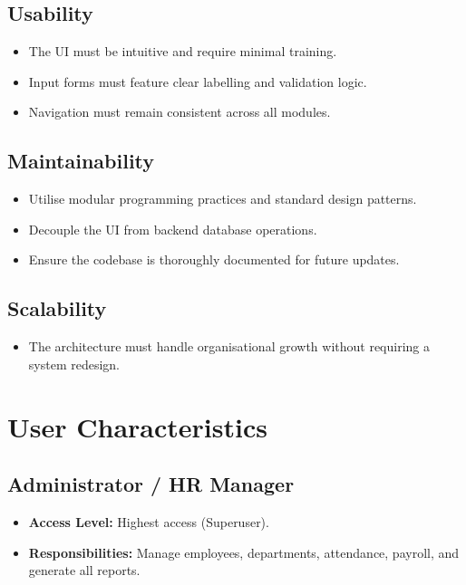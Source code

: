 \documentclass[12pt,a4paper]{report}
\begin{document}
\subsection{Usability}
\begin{itemize}
  \item The UI must be intuitive and require minimal training.
  \item Input forms must feature clear labelling and validation logic.
  \item Navigation must remain consistent across all modules.
\end{itemize}

\subsection{Maintainability}
\begin{itemize}
  \item Utilise modular programming practices and standard design patterns.
  \item Decouple the UI from backend database operations.
  \item Ensure the codebase is thoroughly documented for future updates.
\end{itemize}

\subsection{Scalability}
\begin{itemize}
  \item The architecture must handle organisational growth without requiring a system redesign.
\end{itemize}

\section{User Characteristics}

\subsection{Administrator / HR Manager}
\begin{itemize}
  \item \textbf{Access Level:} Highest access (Superuser).
  \item \textbf{Responsibilities:} Manage employees, departments, attendance, payroll, and generate all reports.
\end{itemize}
\end{document}
